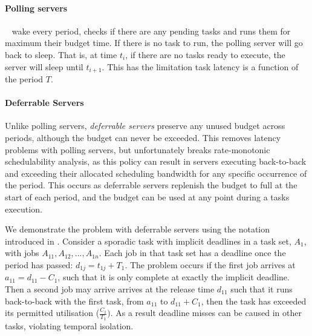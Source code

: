 \paragraph{Polling servers}\label{p:polling-servers}~\citep{Lehoczky_LS_87} wake every period,
checks if there are any pending tasks and runs them for maximum their budget time. If there is no
task to run, the polling server will go back to sleep. That is, at time $t_{i}$, if there are no
tasks ready to execute, the server will sleep until $t_{i+1}$. This has the limitation task latency
is a function of the period $T$.

\paragraph{Deferrable Servers}\label{p:ds} Unlike polling servers, \emph{deferrable
servers}\citep{Lehoczky_LS_87, Strosnider_LS_95} preserve any unused budget across periods, although
the budget can never be exceeded.  This removes latency problems with polling servers, but
unfortunately breaks rate-monotonic schedulability analysis, as this policy can result in servers
executing back-to-back and exceeding their allocated scheduling bandwidth for any specific occurrence of
the period.  This occurs as deferrable servers replenish the budget to full at the start of each
period, and the budget can be used at any point during a tasks execution. 

We demonstrate the problem with deferrable servers using the notation introduced in
. Consider a sporadic task with implicit deadlines in a task set, 
$A_{1}$, with jobs $A_{11}, A_{12}, ..., A_{1n}$. Each job in that task set has a deadline once the
period has passed: $d_{1j} = t_{1j} + T_{1}$. The problem occurs if the first job arrives at $a_{11}
= d_{11} - C_{1}$, such that it is only complete at exactly the implicit deadline.  
Then a second job may arrive arrives at the release time $d_{11}$ such that it runs back-to-back with the first
task, from $a_11$ to $d_{11} + C_{1}$, then the task has exceeded its permitted utilisation 
($\frac{C_{1}}{T_{1}})$. As a result deadline misses can be caused in other
tasks, violating temporal isolation.

